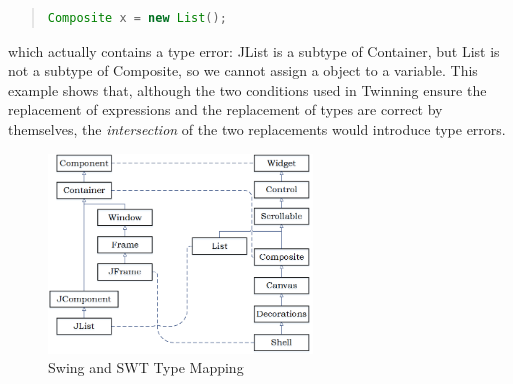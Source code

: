 \begin{quote}
\begin{lstlisting}[language=Java]
Composite x = new List(); 
\end{lstlisting}
\end{quote}
which actually contains a type error:
JList is a subtype of Container, but List is not a subtype of
Composite, so we cannot assign a  object to a
 variable. This example shows that, although the two
conditions used in Twinning ensure the replacement of expressions and the
replacement of types are correct by themselves, the {\em intersection} of
the two replacements would introduce type errors.

\begin{figure}
    \centering
    \includegraphics[width=7cm]{swingtoswt}
    \caption{Swing and SWT Type Mapping} 
    \label{fig-swingtoswt}
\end{figure}



